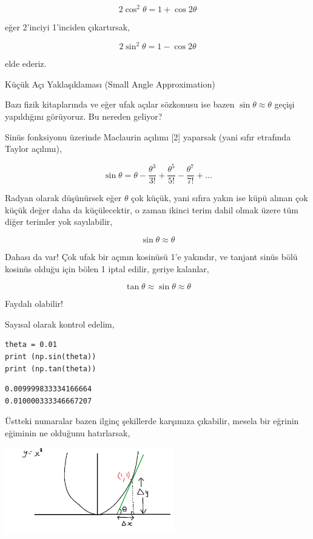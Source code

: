 \documentclass[12pt,fleqn]{article}\usepackage{../../common}
\begin{document}
$$
2\cos^2\theta = 1 + \cos2\theta 
$$

eğer 2'inciyi 1'inciden çıkartırsak,

$$
2\sin^2\theta = 1 - \cos2\theta
$$

elde ederiz.

Küçük Açı Yaklaşıklaması (Small Angle Approximation)

Bazı fizik kitaplarında ve eğer ufak açılar sözkonusu ise bazen $\sin\theta
\approx \theta$ geçişi yapıldığını görüyoruz. Bu nereden geliyor?

Sinüs fonksiyonu üzerinde Maclaurin açılımı [2] yaparsak (yani sıfır etrafında
Taylor açılımı),

$$
\sin\theta =
\theta -
\frac{\theta^3}{3!} +
\frac{\theta^5}{5!} -
\frac{\theta^7}{7!} + ...
$$

Radyan olarak düşünürsek eğer $\theta$ çok küçük, yani sıfıra yakın ise küpü
alınan çok küçük değer daha da küçülecektir, o zaman ikinci terim dahil olmak
üzere tüm diğer terimler yok sayılabilir,

$$
\sin\theta \approx \theta
$$

Dahası da var! Çok ufak bir açının kosinüsü 1'e yakındır, ve tanjant sinüs bölü
kosinüs olduğu için bölen 1 iptal edilir, geriye kalanlar,

$$
\tan\theta \approx \sin\theta \approx \theta
$$

Faydalı olabilir!

Sayısal olarak kontrol edelim,

\begin{verbatim}
theta = 0.01
print (np.sin(theta))
print (np.tan(theta))
\end{verbatim}

\begin{verbatim}
0.009999833334166664
0.010000333346667207
\end{verbatim}

Üstteki numaralar bazen ilginç şekillerde karşımıza çıkabilir, mesela bir
eğrinin eğiminin ne olduğunu hatırlarsak,

\includegraphics[width=20em]{ode_mattuck_50_trig_03.png}
\end{document}
